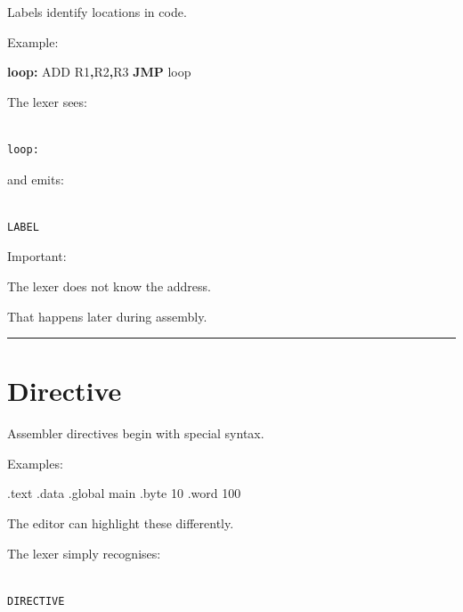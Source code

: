 \documentclass[
  oneside,
  openany]{book}
\newenvironment{Shaded}{\begin{snugshade}}{\end{snugshade}}
\newcommand{\BuiltInTok}[1]{#1}
\newcommand{\ControlFlowTok}[1]{\textcolor[rgb]{0.13,0.29,0.53}{\textbf{#1}}}
\newcommand{\DataTypeTok}[1]{\textcolor[rgb]{0.13,0.29,0.53}{#1}}
\newcommand{\DecValTok}[1]{\textcolor[rgb]{0.00,0.00,0.81}{#1}}
\newcommand{\FunctionTok}[1]{\textcolor[rgb]{0.13,0.29,0.53}{\textbf{#1}}}
\newcommand{\NormalTok}[1]{#1}
\newcommand{\OperatorTok}[1]{\textcolor[rgb]{0.81,0.36,0.00}{\textbf{#1}}}
\begin{document}
Labels identify locations in code.

Example:

\begin{Shaded}
\begin{Highlighting}[]
\FunctionTok{loop:}
    \BuiltInTok{ADD}\NormalTok{ R1}\OperatorTok{,}\NormalTok{R2}\OperatorTok{,}\NormalTok{R3}
    \ControlFlowTok{JMP}\NormalTok{ loop}
\end{Highlighting}
\end{Shaded}

The lexer sees:

\begin{verbatim}

loop:
\end{verbatim}

and emits:

\begin{verbatim}

LABEL
\end{verbatim}

Important:

The lexer does not know the address.

That happens later during assembly.

\begin{center}\rule{0.5\linewidth}{0.5pt}\end{center}

\hypertarget{directive}{%
\section{Directive}\label{directive}}

Assembler directives begin with special syntax.

Examples:

\begin{Shaded}
\begin{Highlighting}[]
\NormalTok{.text}
\NormalTok{.}\BuiltInTok{data}
\NormalTok{.global main}
\NormalTok{.}\DataTypeTok{byte} \DecValTok{10}
\NormalTok{.}\DataTypeTok{word} \DecValTok{100}
\end{Highlighting}
\end{Shaded}

The editor can highlight these differently.

The lexer simply recognises:

\begin{verbatim}

DIRECTIVE
\end{verbatim}
\end{document}
